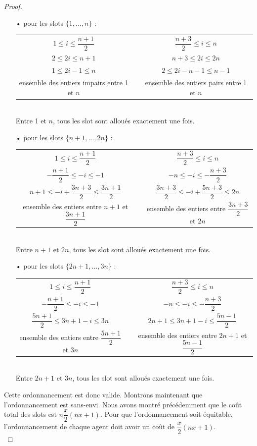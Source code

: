 \documentclass[12pt]{article}
\theoremstyle{definition}
\begin{document}
\begin{itemize}
\begin{proof}
\begin{itemize}
\item[•] pour les slots $\{1,\dots,n\}$ :\\
\begin{tabular}{ccc}
$1\leq i \leq \dfrac{n+1}{2}$ & & $\dfrac{n+3}{2}\leq i \leq n$\\
$2\leq 2i \leq n+1$ & & $n+3\leq 2i\leq 2n$\\
$1\leq 2i-1\leq n$ & & $2\leq 2i - n-1\leq n-1$\\
ensemble des entiers impairs entre 1 et $n$ & & ensemble des entiers pairs entre 1 et $n$
\end{tabular}\\
Entre 1 et $n$, tous les slot sont alloués exactement une fois.
\item[•] pour les slots $\{n+1,\dots,2n\}$ :\\
\begin{tabular}{ccc}
$1\leq i \leq \dfrac{n+1}{2}$ & & $\dfrac{n+3}{2}\leq i \leq n$\\
$-\dfrac{n+1}{2}\leq -i\leq -1$ & & $-n\leq -i \leq -\dfrac{n+3}{2}$\\
$n+1\leq -i+\dfrac{3n+3}{2}\leq \dfrac{3n+1}{2}$ & & $\dfrac{3n+3}{2}\leq -i+\dfrac{5n+3}{2} \leq 2n$\\
ensemble des entiers entre $n+1$ et $\dfrac{3n+1}{2}$ & & ensemble des entiers entre $\dfrac{3n+3}{2}$ et $2n$
\end{tabular}\\
Entre $n+1$ et $2n$, tous les slot sont alloués exactement une fois.
\item[•] pour les slots $\{2n+1,\dots,3n\}$ :\\
\begin{tabular}{ccc}
$1\leq i \leq \dfrac{n+1}{2}$ & & $\dfrac{n+3}{2}\leq i \leq n$\\
$-\dfrac{n+1}{2}\leq -i\leq -1$ & & $-n\leq -i \leq -\dfrac{n+3}{2}$\\
$\dfrac{5n+1}{2}\leq 3n+1-i\leq 3n$ & & $2n+1\leq 3n+1-i \leq \dfrac{5n-1}{2}$\\
ensemble des entiers entre $\dfrac{5n+1}{2}$ et $3n$ & & ensemble des entiers entre $2n + 1$ et $\dfrac{5n-1}{2}$
\end{tabular}\\
Entre $2n+1$ et $3n$, tous les slot sont alloués exactement une fois.\\
\end{itemize}
Cette ordonnancement est donc valide. Montrons maintenant que l'ordonnancement est sans-envi. Nous avons montré précédemment que le coût total des slots est $n\dfrac{x}{2}(nx+1)$. Pour que l'ordonnancement soit équitable, l'ordonnancement de chaque agent doit avoir un coût de $\dfrac{x}{2}(nx+1)$.\\

\end{proof}
\end{itemize}
\end{document}
